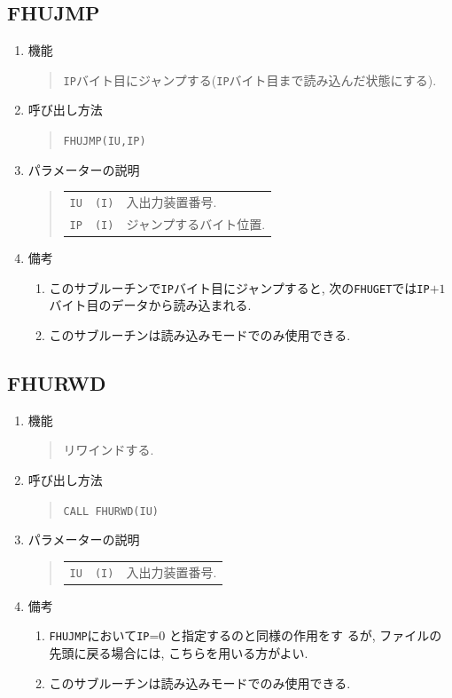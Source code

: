 \subsection{FHUJMP}
\begin{enumerate}
  \item 機能 
  \begin{quote}
   {\tt IP}バイト目にジャンプする({\tt IP}バイト目まで読み込んだ状態にする).
  \end{quote}
  \item 呼び出し方法 
  \begin{quote}
   {\tt FHUJMP(IU,IP)}
  \end{quote}
  \item パラメーターの説明 
  \begin{quote}
    \begin{tabular}{llp{10cm}}
      {\tt IU}   & {\tt (I)} & 入出力装置番号. \\
      {\tt IP}   & {\tt (I)} & ジャンプするバイト位置.
     \end{tabular}
  \end{quote}
  \item 備考 
  \begin{enumerate}
    \item このサブルーチンで{\tt IP}バイト目にジャンプすると,
          次の{\tt FHUGET}では{\tt IP}$+1$バイト目のデータから読み込まれる.
    \item このサブルーチンは読み込みモードでのみ使用できる. 
  \end{enumerate}
\end{enumerate}

\subsection{FHURWD}
\begin{enumerate}
  \item 機能 
  \begin{quote}
    リワインドする. 
  \end{quote}
  \item 呼び出し方法 
  \begin{quote}
    {\tt CALL FHURWD(IU)}
  \end{quote}
  \item パラメーターの説明 
  \begin{quote}
    \begin{tabular}{llp{10cm}}
      {\tt IU}   & {\tt (I)} & 入出力装置番号.
    \end{tabular}
  \end{quote}
  \item 備考 
  \begin{enumerate}
    \item {\tt FHUJMP}において{\tt IP}=0 と指定するのと同様の作用をす
          るが, ファイルの先頭に戻る場合には, こちらを用いる方がよい.
    \item このサブルーチンは読み込みモードでのみ使用できる. 
  \end{enumerate}
\end{enumerate}

